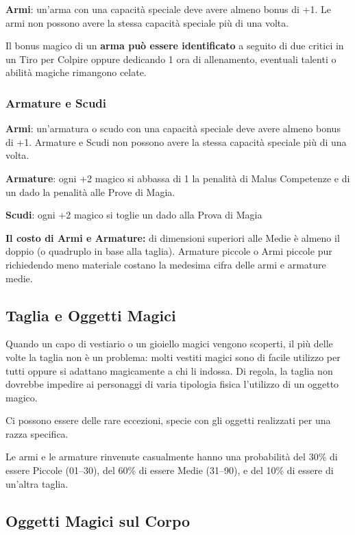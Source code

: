 \begin{multicols}{2}
	\textbf{Armi}: un'arma con una capacità speciale deve avere almeno bonus di +1. Le armi non possono avere la stessa capacità speciale più di una volta.

	Il bonus magico di un \textbf{arma può essere identificato} a seguito di due critici in un Tiro per Colpire oppure dedicando 1 ora di allenamento, eventuali talenti o abilità magiche rimangono celate.

	\subsubsection{Armature e Scudi}

	\textbf{Armi}: un'armatura o scudo con una capacità speciale deve avere almeno bonus di +1. Armature e Scudi non possono avere la stessa capacità speciale più di una volta.

	\textbf{Armature}: ogni +2 magico si abbassa di 1 la penalità di Malus Competenze e di un dado la penalità alle Prove di Magia.

	\textbf{Scudi}: ogni +2 magico si toglie un dado alla Prova di Magia

	\textbf{Il costo di Armi e Armature:} di dimensioni superiori alle Medie è almeno il doppio (o quadruplo in base alla taglia). Armature piccole o Armi piccole pur richiedendo meno materiale costano la medesima cifra delle armi e armature medie.

	\subsection{Taglia e Oggetti Magici}

	\label{taglia-e-oggetti-magici}

	Quando un capo di vestiario o un gioiello magici vengono scoperti, il più delle volte la taglia non è un problema: molti vestiti magici sono di facile utilizzo per tutti oppure si adattano magicamente a chi li indossa. Di regola, la taglia non dovrebbe impedire ai personaggi di varia tipologia fisica l'utilizzo di un oggetto magico.

	Ci possono essere delle rare eccezioni, specie con gli oggetti realizzati per una razza specifica.

	Le armi e le armature rinvenute casualmente hanno una probabilità del 30\% di essere Piccole (01--30), del 60\% di essere Medie (31--90), e del 10\% di essere di un'altra taglia.

	\subsection{Oggetti Magici sul Corpo}


\end{multicols}
